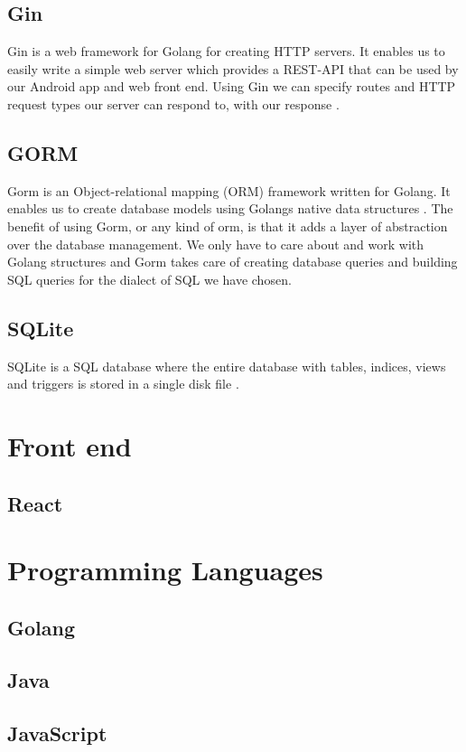 \documentclass[../Main/thesis.tex]{subfiles}
\begin{document}
\subsection{Gin}
Gin is a web framework for Golang for creating HTTP servers.
It enables us to easily write a simple web server which provides a REST-API that can be used by our Android app and web front end. 
Using Gin we can specify routes and HTTP request types our server can respond to, with our response \citep{Martinez-Almeida2017}.
\subsection{GORM}
Gorm is an Object-relational mapping (ORM) framework written for Golang.
It enables us to create database models using Golangs native data structures \citep{JInzhuZhang2018}.
The benefit of using Gorm, or any kind of orm, is that it adds a layer of abstraction over the database management.
We only have to care about and work with Golang structures and Gorm takes care of creating database queries and building SQL queries for the dialect of SQL we have chosen.

\subsection{SQLite}
SQLite is a SQL database where the entire database with tables, indices, views and triggers is stored in a single disk file \citep{Hipp2015}.


\section{Front end}
\subsection{React}

\section{Programming Languages}
\subsection{Golang}
\subsection{Java}
\subsection{JavaScript}
\end{document}
